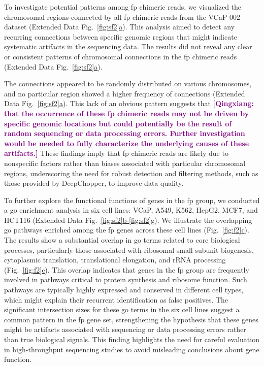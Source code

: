 \documentclass[pdflatex, sn-mathphys-num, lineno]{sn-jnl}%
\newcommand{\qx}[1]{\textcolor{purple}{\textbf{[Qingxiang: #1]}}}
\newcommand{\figref}[2]{Fig.~\hyperref[#1]{\ref*{#1}#2}}
\newcommand{\edfigref}[2]{Extended Data Fig.~\hyperref[#1]{\ref*{#1}#2}}
\newcommand{\edfigrefrg}[3]{Extended Data Fig.~\hyperref[#1]{\ref*{#1}#2-\ref*{#1}#3}}
\theoremstyle{thmstyleone}%
\theoremstyle{thmstyletwo}%
\theoremstyle{thmstylethree}%
\begin{document}
To investigate potential patterns among \gls{fp} chimeric reads, we visualized the chromosomal regions connected by all \gls{fp} chimeric reads from the VCaP 002 dataset (\edfigref{fig:sf2}{a}).
This analysis aimed to detect any recurring connections between specific genomic regions that might indicate systematic artifacts in the sequencing data.
The results did not reveal any clear or consistent patterns of chromosomal connections in the \gls{fp} chimeric reads  (\edfigref{fig:sf2}{a}).

The connections appeared to be randomly distributed on various chromosomes, and no particular region showed a higher frequency of connections (\edfigref{fig:sf2}{a}).
This lack of an obvious pattern suggests that \qx{that the occurrence of these \gls{fp} chimeric reads may not be driven by specific genomic locations but could potentially be the result of random sequencing or data processing errors. Further investigation would be needed to fully characterize the underlying causes of these artifacts.}
These findings imply that \gls{fp} chimeric reads are likely due to nonspecific factors rather than biases associated with particular chromosomal regions, underscoring the need for robust detection and filtering methods, such as those provided by DeepChopper, to improve data quality.

To further explore the functional functions of genes in the \gls{fp} group, we conducted a \gls{go} enrichment analysis in six cell lines: VCaP, A549, K562, HepG2, MCF7, and HCT116 (\edfigrefrg{fig:sf2}{b}{g}).
We illustrate the overlapping \gls{go} pathways enriched among the \gls{fp} genes across these cell lines (\figref{fig:f2}{c}).
The results show a substantial overlap in \gls{go} terms related to core biological processes, particularly those associated with ribosomal small subunit biogenesis, cytoplasmic translation, translational elongation, and rRNA processing (\figref{fig:f2}{c}).
This overlap indicates that genes in the \gls{fp} group are frequently involved in pathways critical to protein synthesis and ribosome function.
Such pathways are typically highly expressed and conserved in different cell types, which might explain their recurrent identification as false positives.
The significant intersection sizes for these \gls{go} terms in the six cell lines suggest a common pattern in the \gls{fp} gene set, strengthening the hypothesis that these genes might be artifacts associated with sequencing or data processing errors rather than true biological signals.
This finding highlights the need for careful evaluation in high-throughput sequencing studies to avoid misleading conclusions about gene function.
\end{document}
